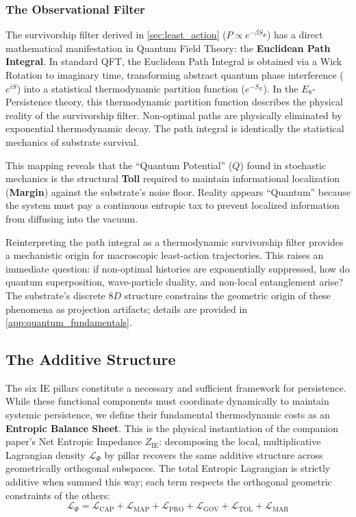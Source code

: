 \subsubsection{The Observational Filter}
\label{subsec:observational_filter}
The survivorship filter derived in \cref{sec:least_action} ($P \propto e^{-\beta S_\Phi}$) has a direct mathematical manifestation in Quantum Field Theory: the \textbf{Euclidean Path Integral}. In standard QFT, the Euclidean Path Integral is obtained via a Wick Rotation to imaginary time, transforming abstract quantum phase interference ($e^{iS}$) into a statistical thermodynamic partition function ($e^{-S_E}$). In the $E_8$-Persistence theory, this thermodynamic partition function describes the physical reality of the survivorship filter. Non-optimal paths are physically eliminated by exponential thermodynamic decay. The path integral is identically the statistical mechanics of substrate survival.

This mapping reveals that the ``Quantum Potential'' ($Q$) found in stochastic mechanics is the structural \textbf{Toll} required to maintain informational localization (\textbf{Margin}) against the substrate's noise floor. Reality appears ``Quantum'' because the system must pay a continuous entropic tax to prevent localized information from diffusing into the vacuum.

Reinterpreting the path integral as a thermodynamic survivorship filter provides a mechanistic origin for macroscopic least-action trajectories. This raises an immediate question: if non-optimal histories are exponentially suppressed, how do quantum superposition, wave-particle duality, and non-local entanglement arise? The substrate's discrete $8D$ structure constrains the geometric origin of these phenomena as projection artifacts; details are provided in \cref{app:quantum_fundamentals}.

\subsection{The Additive Structure}
\label{subsec:additive_structure}

The six IE pillars constitute a necessary and sufficient framework for persistence. While these functional components must coordinate dynamically to maintain systemic persistence, we define their
fundamental thermodynamic costs as an \textbf{Entropic Balance Sheet}. This is the physical instantiation of the companion paper's Net Entropic Impedance $Z_{\mathrm{IE}}$: decomposing the local,
multiplicative Lagrangian density $\mathcal{L}_\Phi$ by pillar recovers the same additive structure across geometrically orthogonal subspaces. The total Entropic Lagrangian is strictly additive when summed this way; each term respects the orthogonal geometric constraints of the others:
\begin{equation}
    \mathcal{L}_{\Phi} = \mathcal{L}_{\mathrm{CAP}} + \mathcal{L}_{\mathrm{MAP}} + \mathcal{L}_{\mathrm{PRO}} 
    + \mathcal{L}_{\mathrm{GOV}} + \mathcal{L}_{\mathrm{TOL}} + \mathcal{L}_{\mathrm{MAR}}
\end{equation}

